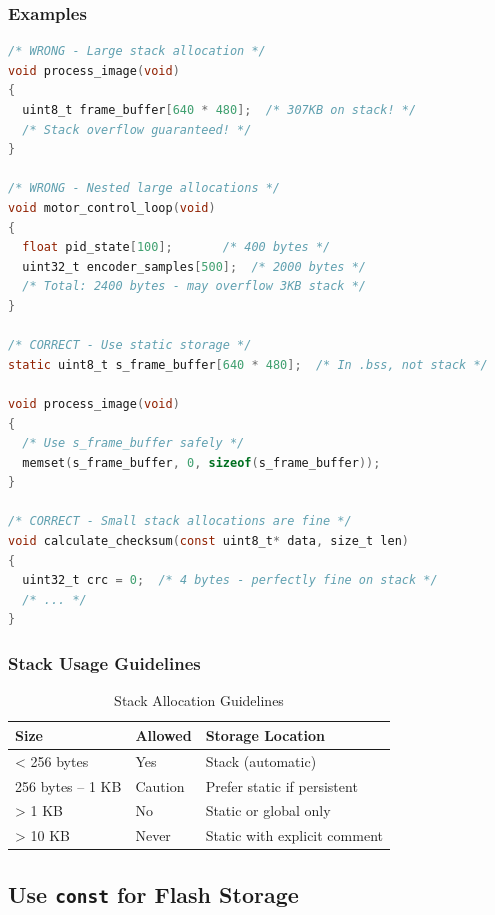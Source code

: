 \subsubsection{Examples}

\begin{lstlisting}[language=C]
/* WRONG - Large stack allocation */
void process_image(void)
{
  uint8_t frame_buffer[640 * 480];  /* 307KB on stack! */
  /* Stack overflow guaranteed! */
}

/* WRONG - Nested large allocations */
void motor_control_loop(void)
{
  float pid_state[100];       /* 400 bytes */
  uint32_t encoder_samples[500];  /* 2000 bytes */
  /* Total: 2400 bytes - may overflow 3KB stack */
}

/* CORRECT - Use static storage */
static uint8_t s_frame_buffer[640 * 480];  /* In .bss, not stack */

void process_image(void)
{
  /* Use s_frame_buffer safely */
  memset(s_frame_buffer, 0, sizeof(s_frame_buffer));
}

/* CORRECT - Small stack allocations are fine */
void calculate_checksum(const uint8_t* data, size_t len)
{
  uint32_t crc = 0;  /* 4 bytes - perfectly fine on stack */
  /* ... */
}


\end{lstlisting}
\subsubsection{Stack Usage Guidelines}

\begin{table}[H]
\centering
\caption{Stack Allocation Guidelines}
\label{tab:stack-guidelines}
\begin{tabular}{|l|l|l|}
\hline
\textbf{Size} & \textbf{Allowed} & \textbf{Storage Location} \\
\hline
< 256 bytes & Yes & Stack (automatic) \\
\hline
256 bytes -- 1 KB & Caution & Prefer static if persistent \\
\hline
> 1 KB & No & Static or global only \\
\hline
> 10 KB & Never & Static with explicit comment \\
\hline
\end{tabular}
\end{table}

\subsection{Use \texttt{const} for Flash Storage}

